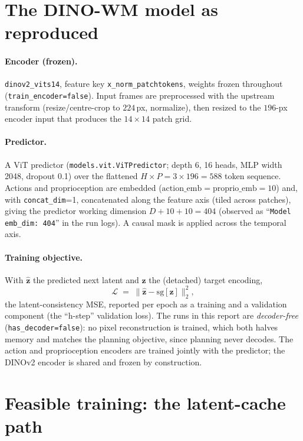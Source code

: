 \documentclass[11pt,a4paper]{article}
\newcommand{\zlat}{\mathbf{z}}
\begin{document}
\section{The DINO-WM model as reproduced}
\label{sec:model}

\paragraph{Encoder (frozen).} \texttt{dinov2\_vits14}, feature key
\texttt{x\_norm\_patchtokens}, weights frozen throughout
(\texttt{train\_encoder=false}). Input frames are preprocessed with the
upstream transform (resize/centre-crop to $224$\,px, normalize), then resized
to the $196$-px encoder input that produces the $14{\times}14$ patch grid.

\paragraph{Predictor.} A ViT predictor (\texttt{models.vit.ViTPredictor};
depth 6, 16 heads, MLP width 2048, dropout 0.1) over the flattened
$H \times P = 3 \times 196 = 588$ token sequence. Actions and proprioception
are embedded ($\text{action\_emb}{=}\text{proprio\_emb}{=}10$) and, with
\texttt{concat\_dim}=1, concatenated along the feature axis (tiled across
patches), giving the predictor working dimension
$D + 10 + 10 = 404$ (observed as ``\texttt{Model emb\_dim: 404}'' in the run
logs). A causal mask is applied across the temporal axis.

\paragraph{Training objective.} With $\hat{\zlat}$ the predicted next latent
and $\zlat$ the (detached) target encoding,
\begin{equation}
\mathcal{L} \;=\; \big\lVert \hat{\zlat} - \mathrm{sg}[\zlat] \big\rVert_2^2 ,
\label{eq:loss}
\end{equation}
the latent-consistency MSE, reported per epoch as a training and a validation
component (the ``h-step'' validation loss). The runs in this report are
\emph{decoder-free} (\texttt{has\_decoder=false}): no pixel reconstruction is
trained, which both halves memory and matches the planning objective, since
planning never decodes. The action and proprioception encoders are trained
jointly with the predictor; the DINOv2 encoder is shared and frozen by
construction.

\section{Feasible training: the latent-cache path}
\label{sec:training}
\end{document}
